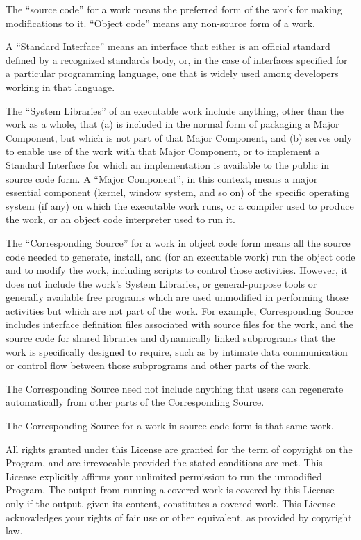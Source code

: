 \documentclass[11pt]{article}
\newcounter{v2section}
\newcounter{v3section}
\begin{document}

 The ``source code'' for a work means the preferred form of the work for
making modifications to it.  ``Object code'' means any non-source form
of a work.

  A ``Standard Interface'' means an interface that either is an official
standard defined by a recognized standards body, or, in the case of
interfaces specified for a particular programming language, one that is
widely used among developers working in that language.

  The ``System Libraries'' of an executable work include anything, other
than the work as a whole, that (a) is included in the normal form of
packaging a Major Component, but which is not part of that Major
Component, and (b) serves only to enable use of the work with that Major
Component, or to implement a Standard Interface for which an
implementation is available to the public in source code form.  A
``Major Component'', in this context, means a major essential component
(kernel, window system, and so on) of the specific operating system (if
any) on which the executable work runs, or a compiler used to produce
the work, or an object code interpreter used to run it.

  The ``Corresponding Source'' for a work in object code form means all
the source code needed to generate, install, and (for an executable
work) run the object code and to modify the work, including scripts to
control those activities.  However, it does not include the work's
System Libraries, or general-purpose tools or generally available free
programs which are used unmodified in performing those activities but
which are not part of the work.  For example, Corresponding Source
includes interface definition files associated with source files for the
work, and the source code for shared libraries and dynamically linked
subprograms that the work is specifically designed to require, such as
by intimate data communication or control flow between those subprograms
and other parts of the work.

  The Corresponding Source need not include anything that users
can regenerate automatically from other parts of the Corresponding
Source.

  The Corresponding Source for a work in source code form is that
same work.


  All rights granted under this License are granted for the term of
copyright on the Program, and are irrevocable provided the stated
conditions are met.  This License explicitly affirms your unlimited
permission to run the unmodified Program.  The output from running a
covered work is covered by this License only if the output, given its
content, constitutes a covered work.  This License acknowledges your
rights of fair use or other equivalent, as provided by copyright law.
\end{document}
